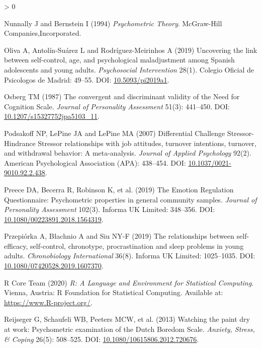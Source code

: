 \documentclass[
  english,
  man,floatsintext]{apa6}
\newlength{\cslhangindent}
\newenvironment{CSLReferences}[2] %
 {%
  \setlength{\parindent}{0pt}
  \ifodd #1 \everypar{\setlength{\hangindent}{\cslhangindent}}\ignorespaces\fi
  \ifnum #2 > 0
  \setlength{\parskip}{#2\baselineskip}
  \fi
 }%
 {}
\begin{document}
\begin{CSLReferences}{1}{0}
\leavevmode\hypertarget{ref-Nunnally1994}{}%
Nunnally J and Bernstein I (1994) \emph{Psychometric {Theory}}. McGraw-Hill Companies,Incorporated.

\leavevmode\hypertarget{ref-Oliva2019}{}%
Oliva A, Antolín-Suárez L and Rodríguez-Meirinhos A (2019) Uncovering the link between self-control, age, and psychological maladjustment among {Spanish} adolescents and young adults. \emph{Psychosocial Intervention} 28(1). Colegio Oficial de Psicologos de Madrid: 49--55. DOI: \href{https://doi.org/10.5093/pi2019a1}{10.5093/pi2019a1}.

\leavevmode\hypertarget{ref-Osberg1987}{}%
Osberg TM (1987) The convergent and discriminant validity of the {Need} for {Cognition} {Scale}. \emph{Journal of Personality Assessment} 51(3): 441--450. DOI: \href{https://doi.org/10.1207/s15327752jpa5103_11}{10.1207/s15327752jpa5103\_11}.

\leavevmode\hypertarget{ref-Podsakoff2007}{}%
Podsakoff NP, LePine JA and LePine MA (2007) Differential {Challenge Stressor-Hindrance Stressor} relationships with job attitudes, turnover intentions, turnover, and withdrawal behavior: A meta-analysis. \emph{Journal of Applied Psychology} 92(2). American Psychological Association ({APA}): 438--454. DOI: \href{https://doi.org/10.1037/0021-9010.92.2.438}{10.1037/0021-9010.92.2.438}.

\leavevmode\hypertarget{ref-Preece2019}{}%
Preece DA, Becerra R, Robinson K, et al. (2019) {The Emotion Regulation Questionnaire: Psychometric} properties in general community samples. \emph{Journal of Personality Assessment} 102(3). Informa {UK} Limited: 348--356. DOI: \href{https://doi.org/10.1080/00223891.2018.1564319}{10.1080/00223891.2018.1564319}.

\leavevmode\hypertarget{ref-Przepiorka2019}{}%
Przepiórka A, Błachnio A and Siu NY-F (2019) The relationships between self-efficacy, self-control, chronotype, procrastination and sleep problems in young adults. \emph{Chronobiology International} 36(8). Informa {UK} Limited: 1025--1035. DOI: \href{https://doi.org/10.1080/07420528.2019.1607370}{10.1080/07420528.2019.1607370}.

\leavevmode\hypertarget{ref-RCT2020}{}%
R Core Team (2020) \emph{R: {A} Language and Environment for Statistical Computing}. Vienna, Austria: R Foundation for Statistical Computing. Available at: \url{https://www.R-project.org/}.

\leavevmode\hypertarget{ref-Reijseger2013}{}%
Reijseger G, Schaufeli WB, Peeters MCW, et al. (2013) Watching the paint dry at work: Psychometric examination of the {Dutch} {Boredom} {Scale}. \emph{Anxiety, Stress, \& Coping} 26(5): 508--525. DOI: \href{https://doi.org/10.1080/10615806.2012.720676}{10.1080/10615806.2012.720676}.


\end{CSLReferences}
\end{document}
